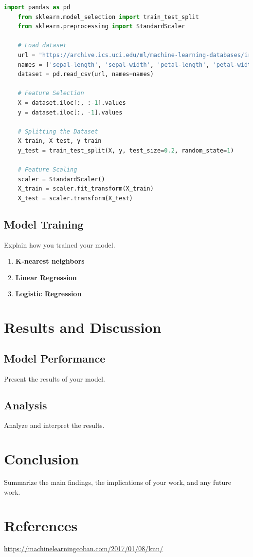 \documentclass[a4paper]{article}
\begin{document}
\begin{lstlisting}[language=Python]
	import pandas as pd
	from sklearn.model_selection import train_test_split
	from sklearn.preprocessing import StandardScaler
	
	# Load dataset
	url = "https://archive.ics.uci.edu/ml/machine-learning-databases/iris/iris.data"
	names = ['sepal-length', 'sepal-width', 'petal-length', 'petal-width', 'class']
	dataset = pd.read_csv(url, names=names)
	
	# Feature Selection
	X = dataset.iloc[:, :-1].values
	y = dataset.iloc[:, -1].values
	
	# Splitting the Dataset
	X_train, X_test, y_train
	y_test = train_test_split(X, y, test_size=0.2, random_state=1)
	
	# Feature Scaling
	scaler = StandardScaler()
	X_train = scaler.fit_transform(X_train)
	X_test = scaler.transform(X_test)
\end{lstlisting}

\subsection{Model Training}
Explain how you trained your model.
\begin{enumerate}
	\item \textbf{K-nearest neighbors} 
	\item \textbf{Linear Regression} 
	\item \textbf{Logistic Regression} 
\end{enumerate}
\section{Results and Discussion}
\subsection{Model Performance}
Present the results of your model.

\subsection{Analysis}
Analyze and interpret the results.

\section{Conclusion}
Summarize the main findings, the implications of your work, and any future work.

\section{References}
\href{https://machinelearningcoban.com/2017/01/08/knn/}{https://machinelearningcoban.com/2017/01/08/knn/}
\end{document}
